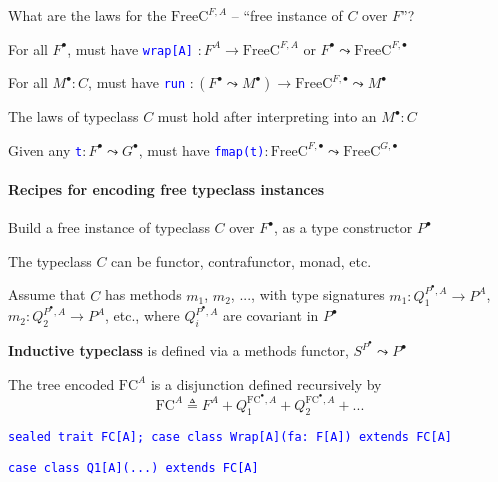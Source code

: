 What are the laws for the{\footnotesize{} $\text{FreeC}^{F,A}$} –
\textsf{``}free instance of $C$ over $F$\textsf{''}?

For all $F^{\bullet}$, must have \texttt{\textcolor{blue}{\footnotesize{}wrap{[}A{]}}}
$:F^{A}\rightarrow\text{FreeC}^{F,A}$ or $F^{\bullet}\leadsto\text{FreeC}^{F,\bullet}$

For all $M^{\bullet}:C$, must have \texttt{\textcolor{blue}{\footnotesize{}run}}
$:\left(F^{\bullet}\leadsto M^{\bullet}\right)\rightarrow\text{FreeC}^{F,\bullet}\leadsto M^{\bullet}$

The laws of typeclass $C$ must hold after interpreting into an $M^{\bullet}:C$

Given any \texttt{\textcolor{blue}{\footnotesize{}t}}$:F^{\bullet}\leadsto G^{\bullet}$,
must have \texttt{\textcolor{blue}{\footnotesize{}fmap(t)}}$:\text{FreeC}^{F,\bullet}\leadsto\text{FreeC}^{G,\bullet}$


\paragraph{Recipes for encoding free typeclass instances}

Build a free instance of typeclass $C$ over $F^{\bullet}$, as a
type constructor $P^{\bullet}$ 

The typeclass $C$ can be functor, contrafunctor, monad, etc.

Assume that $C$ has methods $m_{1}$, $m_{2}$, ..., with type signatures
{\footnotesize{}$m_{1}:Q_{1}^{P^{\bullet},A}\rightarrow P^{A}$},
{\footnotesize{}$m_{2}:Q_{2}^{P^{\bullet},A}\rightarrow P^{A}$},
etc., where $Q_{i}^{P^{\bullet},A}$ are covariant in $P^{\bullet}$ 

\textbf{Inductive typeclass} is defined via a methods functor, $S^{P^{\bullet}}\leadsto P^{\bullet}$

The tree encoded $\text{FC}^{A}$ is a disjunction defined recursively
by{\footnotesize{}
\[
\text{FC}^{A}\triangleq F^{A}+Q_{1}^{\text{FC}^{\bullet},A}+Q_{2}^{\text{FC}^{\bullet},A}+...
\]
}{\footnotesize\par}

\texttt{\textcolor{blue}{\footnotesize{}sealed trait FC{[}A{]}; case
class Wrap{[}A{]}(fa: F{[}A{]}) extends FC{[}A{]}}}{\footnotesize\par}

\texttt{\textcolor{blue}{\footnotesize{}case class Q1{[}A{]}(...)
extends FC{[}A{]}}}{\footnotesize\par}

